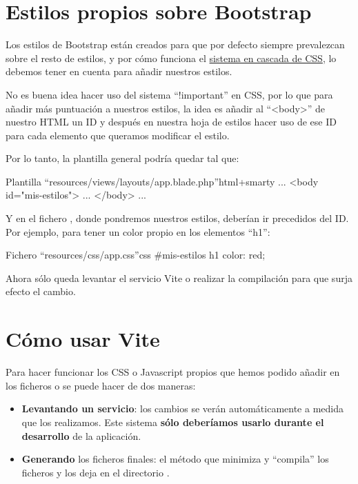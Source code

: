 \section{Estilos propios sobre Bootstrap}
Los estilos de Bootstrap están creados para que por defecto siempre prevalezcan sobre el resto de estilos, y por cómo funciona el  \href{https://css-tricks.com/specifics-on-css-specificity/}{sistema en cascada de CSS}, lo debemos tener en cuenta para añadir nuestros estilos.

No es buena idea hacer uso del sistema “!important” en CSS, por lo que para añadir más puntuación a nuestros estilos, la idea es añadir al “<body>” de nuestro HTML un ID y después en nuestra hoja de estilos hacer uso de ese ID para cada elemento que queramos modificar el estilo.

Por lo tanto, la plantilla general  podría quedar tal que:

\begin{mycode}{Plantilla “resources/views/layouts/app.blade.php”}{html+smarty}{}
...
<body id="mis-estilos">
    ...
</body>
...
\end{mycode}

Y en el fichero , donde pondremos nuestros estilos, deberían ir precedidos del ID. Por ejemplo, para tener un color propio en los elementos “h1”:

\begin{mycode}{Fichero “resources/css/app.css”}{css}{}
#mis-estilos h1{
    color: red;
}
\end{mycode}

Ahora sólo queda levantar el servicio Vite o realizar la compilación para que surja efecto el cambio.


\section{Cómo usar Vite}
Para hacer funcionar los CSS o Javascript propios que hemos podido añadir en los ficheros  o  se puede hacer de dos maneras:

\begin{itemize}
    \item \textbf{Levantando un servicio}: los cambios se verán automáticamente a medida que los realizamos. Este sistema \textbf{sólo deberíamos usarlo durante el desarrollo} de la aplicación.

    \item \textbf{Generando} los ficheros finales: el método que minimiza y “compila” los ficheros y los deja en el directorio .
\end{itemize}

